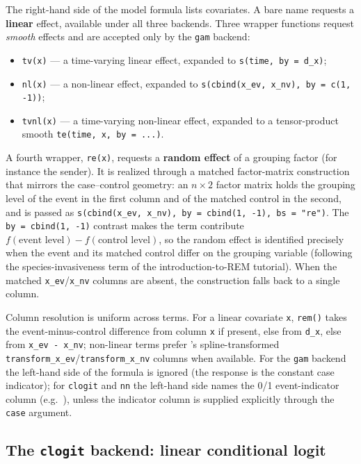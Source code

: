 The right-hand side of the model formula lists covariates. A bare name requests
a \textbf{linear} effect, available under all three backends. Three wrapper
functions request \emph{smooth} effects and are accepted only by the
\texttt{gam} backend:
\begin{itemize}
  \item \texttt{tv(x)} --- a time-varying linear effect, expanded to
    \texttt{s(time, by = d\_x)};
  \item \texttt{nl(x)} --- a non-linear effect, expanded to
    \texttt{s(cbind(x\_ev, x\_nv), by = c(1, -1))};
  \item \texttt{tvnl(x)} --- a time-varying non-linear effect, expanded to a
    tensor-product smooth \texttt{te(time, x, by = ...)}.
\end{itemize}
A fourth wrapper, \texttt{re(x)}, requests a \textbf{random effect} of a
grouping factor (for instance the sender). It is realized through a matched
factor-matrix construction that mirrors the case--control geometry: an
$n \times 2$ factor matrix holds the grouping level of the event in the first
column and of the matched control in the second, and is passed as
\texttt{s(cbind(x\_ev, x\_nv), by = cbind(1, -1), bs = "re")}. The
\texttt{by = cbind(1, -1)} contrast makes the term contribute
$f(\text{event level}) - f(\text{control level})$, so the random effect is
identified precisely when the event and its matched control differ on the
grouping variable (following the species-invasiveness term of the
introduction-to-REM tutorial). When the matched \texttt{x\_ev}/\texttt{x\_nv}
columns are absent, the construction falls back to a single column.

Column resolution is uniform across terms. For a linear covariate \texttt{x},
\texttt{rem()} takes the event-minus-control difference from column \texttt{x}
if present, else from \texttt{d\_x}, else from \texttt{x\_ev - x\_nv};
non-linear terms prefer 's spline-transformed
\texttt{transform\_x\_ev}/\texttt{transform\_x\_nv} columns when available. For
the \texttt{gam} backend the left-hand side of the formula is ignored (the
response is the constant case indicator); for \texttt{clogit} and \texttt{nn}
the left-hand side names the 0/1 event-indicator column (e.g.\
), unless the indicator column is supplied
explicitly through the \texttt{case} argument.

\subsection{The \texttt{clogit} backend: linear conditional logit}
\label{sec:framework-clogit}

